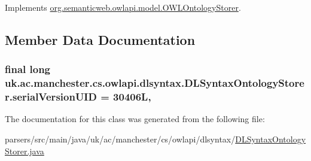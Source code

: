 Implements \hyperlink{interfaceorg_1_1semanticweb_1_1owlapi_1_1model_1_1_o_w_l_ontology_storer_a7cdc556d90147cb44bee843514556e3c}{org.\-semanticweb.\-owlapi.\-model.\-O\-W\-L\-Ontology\-Storer}.



\subsection{Member Data Documentation}
\hypertarget{classuk_1_1ac_1_1manchester_1_1cs_1_1owlapi_1_1dlsyntax_1_1_d_l_syntax_ontology_storer_aa3428d869db37ac4b38882e694c23ef1}{
\subsubsection[{serial\-Version\-U\-I\-D}]{\setlength{\rightskip}{0pt plus 5cm}final long uk.\-ac.\-manchester.\-cs.\-owlapi.\-dlsyntax.\-D\-L\-Syntax\-Ontology\-Storer.\-serial\-Version\-U\-I\-D = 30406\-L\hspace{0.3cm}{\ttfamily [static]}, {\ttfamily [private]}}}\label{classuk_1_1ac_1_1manchester_1_1cs_1_1owlapi_1_1dlsyntax_1_1_d_l_syntax_ontology_storer_aa3428d869db37ac4b38882e694c23ef1}


The documentation for this class was generated from the following file\-:\begin{DoxyCompactItemize}
\item 
parsers/src/main/java/uk/ac/manchester/cs/owlapi/dlsyntax/\hyperlink{_d_l_syntax_ontology_storer_8java}{D\-L\-Syntax\-Ontology\-Storer.\-java}\end{DoxyCompactItemize}
